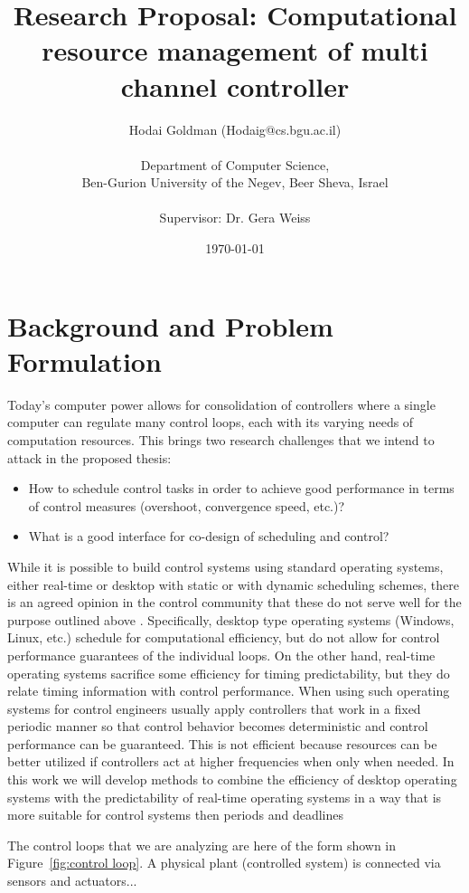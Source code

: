 \documentclass[11pt]{article}
\author{Hodai Goldman (Hodaig@cs.bgu.ac.il) \\ \\Department of Computer Science, \\Ben-Gurion University of the Negev, Beer Sheva, Israel \\ \\Supervisor: Dr. Gera Weiss}
\date{\today}
\title{Research Proposal: Computational resource management of multi channel controller}
\begin{document}
\begin{titlepage}
\maketitle
\end{titlepage}




\section{Background and Problem Formulation}
\label{sec:Background}
Today's computer power allows for consolidation of controllers where a single computer can regulate many control loops, each with its varying needs of computation resources.
This brings two research challenges that we intend to attack in the proposed thesis:
\begin{itemize}
	\item How to schedule control tasks in order to achieve good performance in terms of control measures (overshoot, convergence speed, etc.)?
	\item What is a good interface for co-design of scheduling and control?
\end{itemize}

While it is possible to build control systems using standard operating systems, either real-time or desktop with static or with dynamic scheduling schemes, there is an agreed opinion in the control community that these do not serve well for the purpose outlined above \cite{??}. Specifically, desktop type operating systems (Windows, Linux, etc.) schedule for computational efficiency, but do not allow for control performance guarantees of the individual loops. On the other hand, real-time operating systems sacrifice some efficiency for timing predictability, but they do relate timing information with control performance. When using such operating systems for control engineers usually apply controllers that work in a fixed periodic manner so that control behavior becomes deterministic and control performance can be guaranteed. This is not efficient because resources can be better utilized if controllers act at higher frequencies when only when needed. 
In this work we will develop methods to combine the efficiency of desktop operating systems with the predictability of real-time operating systems in a way that is more suitable for control systems then periods and deadlines

The control loops that we are analyzing are here of the form shown in Figure~\ref{fig:control loop}. A physical plant (controlled system) is connected via sensors and actuators... %
\end{document}
